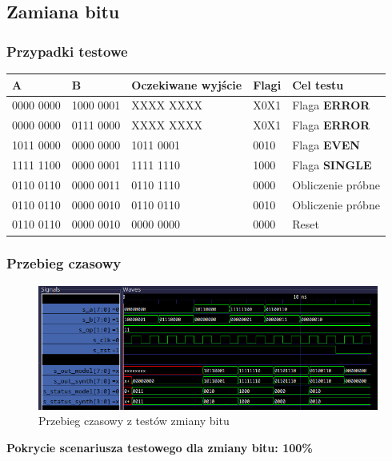 \documentclass[12pt]{article}
\begin{document}
	
	
	\subsection*{Zamiana bitu}
	\subsubsection*{Przypadki testowe}
	\begin{table}[H]
		\centering
		\begin{tabular}{|l|l|l|l|l|}
			\hline
			\textbf{A} & \textbf{B} & \textbf{Oczekiwane wyjście} & \textbf{Flagi} & \textbf{Cel testu} \\ \hline
			0000 0000 & 1000 0001 & XXXX XXXX & X0X1 & Flaga \textbf{ERROR} \\ \hline
			0000 0000 & 0111 0000 & XXXX XXXX & X0X1 & Flaga \textbf{ERROR} \\ \hline
			1011 0000 & 0000 0000 & 1011 0001 & 0010 & Flaga \textbf{EVEN} \\ \hline
			1111 1100 & 0000 0001 & 1111 1110 & 1000 & Flaga \textbf{SINGLE} \\ \hline
			0110 0110 & 0000 0011 & 0110 1110 & 0000 & Obliczenie próbne \\ \hline
			0110 0110 & 0000 0010 & 0110 0110 & 0010 & Obliczenie próbne \\ \hline
			0110 0110 & 0000 0010 & 0000 0000 & 0000 & Reset \\ \hline
		\end{tabular}
	\end{table}
	\subsubsection*{Przebieg czasowy}
			\begin{figure}[H]
		\begin{center}
			\includegraphics[width=\textwidth]{../Testy/Wyniki_testow/Testy_chg.png}
			\caption*{Przebieg czasowy z testów zmiany bitu}
			\label{figure:test_chg}
		\end{center}
	\end{figure}
	\vspace{-20pt}
	\textbf{Pokrycie scenariusza testowego dla zmiany bitu: 100\%}
	
\end{document}
